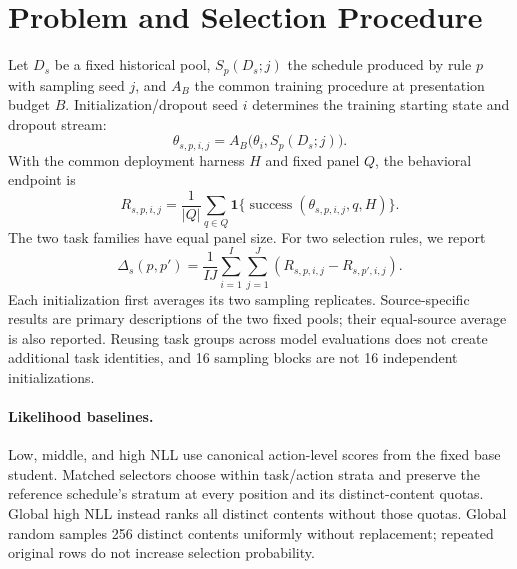 \documentclass{article}
\begin{document}


\section{Problem and Selection Procedure}
Let $D_s$ be a fixed historical pool, $S_p(D_s;j)$ the schedule produced by rule $p$ with sampling seed $j$, and $A_B$ the common training procedure at presentation budget $B$. Initialization/dropout seed $i$ determines the training starting state and dropout stream:
\begin{equation}
\theta_{s,p,i,j}=A_B\bigl(\theta_i,S_p(D_s;j)\bigr).
\end{equation}
With the common deployment harness $H$ and fixed panel $Q$, the behavioral endpoint is
\begin{equation}
R_{s,p,i,j}=\frac{1}{|Q|}\sum_{q\in Q}\mathbf{1}\{\operatorname{success}(\theta_{s,p,i,j},q,H)\}.
\end{equation}
The two task families have equal panel size. For two selection rules, we report
\begin{equation}
\Delta_s(p,p')=\frac{1}{IJ}\sum_{i=1}^{I}\sum_{j=1}^{J}(R_{s,p,i,j}-R_{s,p',i,j}).
\end{equation}
Each initialization first averages its two sampling replicates. Source-specific results are primary descriptions of the two fixed pools; their equal-source average is also reported. Reusing task groups across model evaluations does not create additional task identities, and 16 sampling blocks are not 16 independent initializations.

\paragraph{Likelihood baselines.} Low, middle, and high NLL use canonical action-level scores from the fixed base student. Matched selectors choose within task/action strata and preserve the reference schedule's stratum at every position and its distinct-content quotas. Global high NLL instead ranks all distinct contents without those quotas. Global random samples 256 distinct contents uniformly without replacement; repeated original rows do not increase selection probability.
\end{document}
